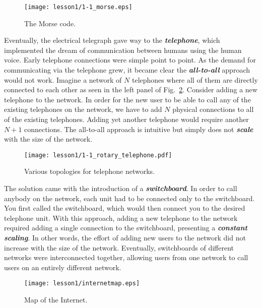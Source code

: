 \begin{figure}[t]
    \centering
    \texttt{[image: lesson1/1-1\_morse.eps]}
    \caption[The Morse code]{The Morse code.}
    \label{fig:1-1_morse}
\end{figure}

Eventually, the electrical telegraph gave way to the \textit{\textbf{telephone}}, which implemented the dream of communication between humans using the human voice.
Early telephone connections were simple point to point.
As the demand for communicating via the telephone grew, it became clear the \textit{\textbf{all-to-all}} approach would not work.
Imagine a network of $N$ telephones where all of them are directly connected to each other as seen in the left panel of Fig.~\ref{fig:1-1_telephone}.
Consider adding a new telephone to the network.
In order for the new user to be able to call any of the existing telephones on the network, we have to add $N$ physical connections to all of the existing telephones.
Adding yet another telephone would require another $N+1$ connections.
The all-to-all approach is intuitive but simply does not \textit{\textbf{scale}} with the size of the network.

\begin{figure}[h]
    \centering
    \texttt{[image: lesson1/1-1\_rotary\_telephone.pdf]}
    \caption[Telephone networks]{Various topologies for telephone networks.}
    \label{fig:1-1_telephone}
\end{figure}

The solution came with the introduction of a \textit{\textbf{switchboard}}.
In order to call anybody on the network, each unit had to be connected only to the switchboard.
You first called the switchboard, which would then connect you to the desired telephone unit.
With this approach, adding a new telephone to the network required adding a single connection to the switchboard, presenting a \textit{\textbf{constant scaling}}.
In other words, the effort of adding new users to the network did not increase with the size of the network.
Eventually, switchboards of different networks were interconnected together, allowing users from one network to call users on an entirely different network.

\begin{figure}[h]
    \centering
    \texttt{[image: lesson1/internetmap.eps]}
    \caption[Map of the Internet.]{Map of the Internet.}
    \label{fig:1-1_internet}
\end{figure}

